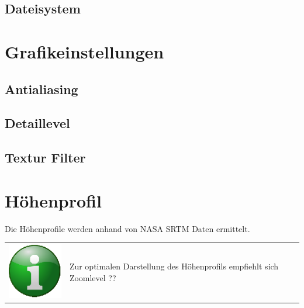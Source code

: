 \documentclass[10pt]{scrreprt}
\begin{document}
\subsection{Dateisystem}





\vspace{3mm}
\section{Grafikeinstellungen}

\vspace{3mm}
\subsection{Antialiasing}  

\vspace{3mm}
\subsection{Detaillevel}  

\vspace{3mm}
\subsection{Textur Filter}  





\vspace{3mm}
\section{Höhenprofil}
Die Höhenprofile werden anhand von NASA  SRTM  Daten ermittelt.

\vspace{3mm}
\begin{tabular}{>{\centering \arraybackslash}m{1cm} m{14cm}}
\includegraphics[scale=0.5]{images/info.eps} &  Zur optimalen Darstellung des Höhenprofils empfiehlt sich Zoomlevel ?? \\ 
\end{tabular} 
\end{document}
